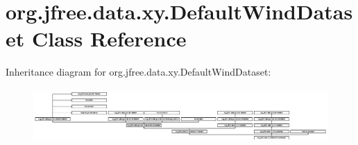 \hypertarget{classorg_1_1jfree_1_1data_1_1xy_1_1_default_wind_dataset}{}\section{org.\+jfree.\+data.\+xy.\+Default\+Wind\+Dataset Class Reference}
\label{classorg_1_1jfree_1_1data_1_1xy_1_1_default_wind_dataset}
Inheritance diagram for org.\+jfree.\+data.\+xy.\+Default\+Wind\+Dataset\+:\begin{figure}[H]
\begin{center}
\leavevmode
\includegraphics[height=2.051282cm]{classorg_1_1jfree_1_1data_1_1xy_1_1_default_wind_dataset}
\end{center}
\end{figure}
